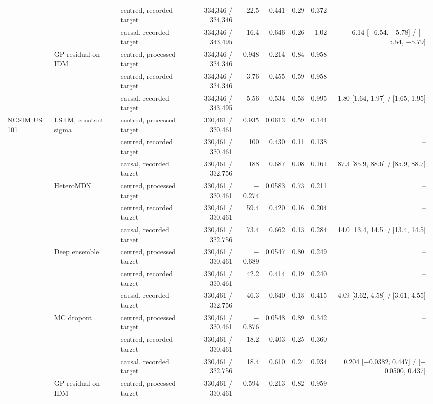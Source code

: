 \begin{longtable}{lllrrrrrr}
 &  & centred, recorded target & 334,346 / 334,346 & 22.5 & 0.441 & 0.29 & 0.372 & -- \\
 &  & causal, recorded target & 334,346 / 343,495 & 16.4 & 0.646 & 0.26 & 1.02 & $-$6.14 [$-$6.54, $-$5.78] / [$-$6.54, $-$5.79] \\
\midrule
 & GP residual on IDM & centred, processed target & 334,346 / 334,346 & 0.948 & 0.214 & 0.84 & 0.958 & -- \\
 &  & centred, recorded target & 334,346 / 334,346 & 3.76 & 0.455 & 0.59 & 0.958 & -- \\
 &  & causal, recorded target & 334,346 / 343,495 & 5.56 & 0.534 & 0.58 & 0.995 & 1.80 [1.64, 1.97] / [1.65, 1.95] \\
\midrule
NGSIM US-101 & LSTM, constant sigma & centred, processed target & 330,461 / 330,461 & 0.935 & 0.0613 & 0.59 & 0.144 & -- \\
 &  & centred, recorded target & 330,461 / 330,461 & 100 & 0.430 & 0.11 & 0.138 & -- \\
 &  & causal, recorded target & 330,461 / 332,756 & 188 & 0.687 & 0.08 & 0.161 & 87.3 [85.9, 88.6] / [85.9, 88.7] \\
\midrule
 & HeteroMDN & centred, processed target & 330,461 / 330,461 & $-$0.274 & 0.0583 & 0.73 & 0.211 & -- \\
 &  & centred, recorded target & 330,461 / 330,461 & 59.4 & 0.420 & 0.16 & 0.204 & -- \\
 &  & causal, recorded target & 330,461 / 332,756 & 73.4 & 0.662 & 0.13 & 0.284 & 14.0 [13.4, 14.5] / [13.4, 14.5] \\
\midrule
 & Deep ensemble & centred, processed target & 330,461 / 330,461 & $-$0.689 & 0.0547 & 0.80 & 0.249 & -- \\
 &  & centred, recorded target & 330,461 / 330,461 & 42.2 & 0.414 & 0.19 & 0.240 & -- \\
 &  & causal, recorded target & 330,461 / 332,756 & 46.3 & 0.640 & 0.18 & 0.415 & 4.09 [3.62, 4.58] / [3.61, 4.55] \\
\midrule
 & MC dropout & centred, processed target & 330,461 / 330,461 & $-$0.876 & 0.0548 & 0.89 & 0.342 & -- \\
 &  & centred, recorded target & 330,461 / 330,461 & 18.2 & 0.403 & 0.25 & 0.360 & -- \\
 &  & causal, recorded target & 330,461 / 332,756 & 18.4 & 0.610 & 0.24 & 0.934 & 0.204 [$-$0.0382, 0.447] / [$-$0.0500, 0.437] \\
\midrule
 & GP residual on IDM & centred, processed target & 330,461 / 330,461 & 0.594 & 0.213 & 0.82 & 0.959 & -- \\

\end{longtable}
